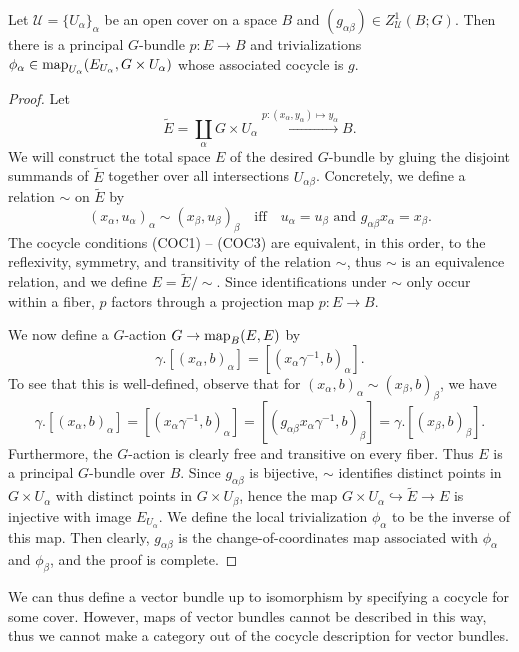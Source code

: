 \documentclass[a4paper,openany]{scrbook}
\begin{document}
\begin{prop}\label{prop:cocycleexistence}
Let $\mathcal U = \{U_\alpha\}_\alpha$ be an open cover on a space $B$ and $(g_{\alpha\beta}) \in Z^1_{\mathcal U}(B;G)$. Then there is a principal $G$-bundle $p\colon E \to B$ and trivializations $\phi_\alpha\in \operatorname{map}_{U_\alpha}(E_{U_\alpha},G \times U_{\alpha})$ whose associated cocycle is $g$.
\end{prop}
\begin{proof}
Let
\[
\tilde E = \coprod_{\alpha} G \times U_\alpha \xrightarrow{p\colon (x_\alpha,y_\alpha) \mapsto y_\alpha} B.
\]
We will construct the total space $E$ of the desired $G$-bundle by gluing the disjoint summands of $\tilde E$ together over all intersections $U_{\alpha\beta}$. Concretely, we define a relation $\sim$ on $\tilde E$ by
\[
  (x_\alpha,u_\alpha)_{\alpha} \sim (x_\beta,u_\beta)_{\beta} \quad \text{iff} \quad u_\alpha=u_\beta \text{ and } g_{\alpha\beta}x_\alpha = x_\beta.
\]
The cocycle conditions (COC1) -- (COC3) are equivalent, in this order, to the reflexivity, symmetry, and transitivity of the relation $\sim$, thus $\sim$ is an equivalence relation, and we define $E = \tilde E/\sim$. Since identifications under $\sim$ only occur within a fiber, $p$ factors through a projection map $p\colon E \to B$.

We now define a $G$-action $G \to \operatorname{map}_B(E,E)$ by
\[
  \gamma.[(x_\alpha,b)_{\alpha}] = [(x_\alpha\gamma^{-1},b)_{\alpha}].
\]
To see that this is well-defined, observe that for $(x_{\alpha},b)_{\alpha} \sim (x_\beta,b)_{\beta}$, we have
\[
  \gamma.[(x_\alpha,b)_{\alpha}] = [(x_\alpha\gamma^{-1},b)_{\alpha}] =[(g_{\alpha\beta}x_\alpha\gamma^{-1},b)_{\beta}]=\gamma.[(x_\beta,b)_{\beta}]  .
\]
Furthermore, the $G$-action is clearly free and transitive on every fiber. Thus $E$ is a principal $G$-bundle over $B$. Since $g_{\alpha\beta}$ is bijective, $\sim$ identifies distinct points in $G \times U_\alpha$ with distinct points in $G \times U_\beta$, hence the map $G \times U_\alpha \hookrightarrow \tilde E \to E$ is injective with image $E_{U_\alpha}$. We define the local trivialization $\phi_\alpha$ to be the inverse of this map. Then clearly, $g_{\alpha\beta}$ is the change-of-coordinates map associated with $\phi_\alpha$ and $\phi_\beta$, and the proof is complete.
\end{proof}

We can thus define a vector bundle up to isomorphism by specifying a cocycle for some cover. However, maps of vector bundles cannot be described in this way, thus we cannot make a category out of the cocycle description for vector bundles. 
\end{document}
